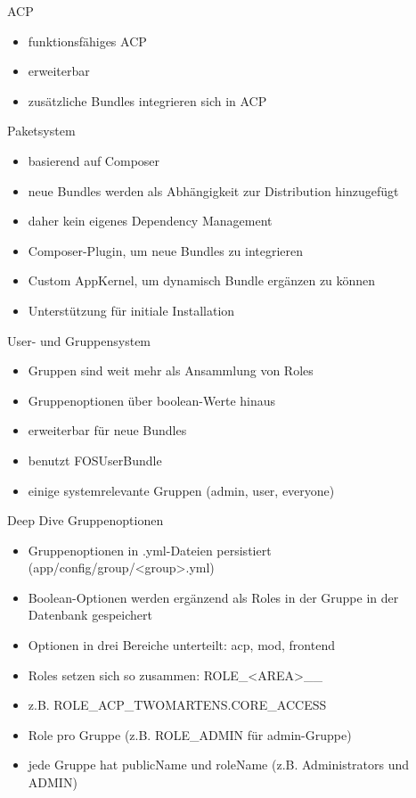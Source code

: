 \documentclass{beamer}
\begin{document}
\begin{frame}{ACP}
  \begin{itemize}
    \item funktionsfähiges ACP
    \item erweiterbar
    \item zusätzliche Bundles integrieren sich in ACP
  \end{itemize}
\end{frame}

\begin{frame}{Paketsystem}
  \begin{itemize}
    \item basierend auf Composer
    \item neue Bundles werden als Abhängigkeit zur Distribution hinzugefügt
    \item daher kein eigenes Dependency Management
    \item Composer-Plugin, um neue Bundles zu integrieren
    \item Custom AppKernel, um dynamisch Bundle ergänzen zu können
    \item Unterstützung für initiale Installation
  \end{itemize}
\end{frame}

\begin{frame}{User- und Gruppensystem}
  \begin{itemize}
    \item Gruppen sind weit mehr als Ansammlung von Roles
    \item Gruppenoptionen über boolean-Werte hinaus
    \item erweiterbar für neue Bundles
    \item benutzt FOSUserBundle
    \item einige systemrelevante Gruppen (admin, user, everyone)
  \end{itemize}
\end{frame}

\begin{frame}{Deep Dive Gruppenoptionen}
  \begin{itemize}
    \item Gruppenoptionen in .yml-Dateien persistiert (app/config/group/<group>.yml)
    \item Boolean-Optionen werden ergänzend als Roles in der Gruppe in der Datenbank gespeichert
    \item Optionen in drei Bereiche unterteilt: acp, mod, frontend
    \item Roles setzen sich so zusammen: ROLE\_<AREA>\_<BUNDLE CATEGORY>\_<OPTION NAME>
    \item z.B. ROLE\_ACP\_TWOMARTENS.CORE\_ACCESS
    \item Role pro Gruppe (z.B. ROLE\_ADMIN für admin-Gruppe)
    \item jede Gruppe hat publicName und roleName (z.B. Administrators und ADMIN)
  \end{itemize}
\end{frame}
\end{document}
